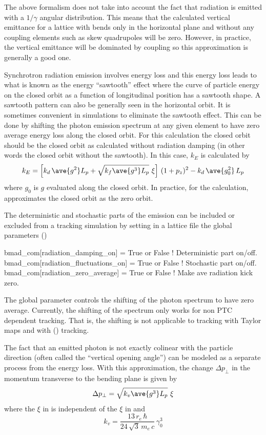 The above formalism does not take into account the fact that radiation is emitted with a $1/\gamma$
angular distribution. This means that the calculated vertical emittance for a lattice with bends
only in the horizontal plane and without any coupling elements such as skew quadrupoles will be
zero. However, in practice, the vertical emittance will be dominated by coupling so this
approximation is generally a good one.

Synchrotron radiation emission involves energy loss and this energy loss leads to what is known as
the energy ``sawtooth'' effect where the curve of particle energy on the closed orbit as a function
of longitudinal position has a sawtooth shape. A sawtooth pattern can also be generally seen in the
horizontal orbit. It is sometimes convenient in simulations to eliminate the sawtooth effect. This
can be done by shifting the photon emission spectrum at any given element to have zero average
energy loss along the closed orbit. For this calculation the closed orbit should be the closed orbit
as calculated without radiation damping (in other words the closed orbit without the sawtooth). In
this case, $k_E$ is calculated by
\begin{equation}
  k_E = \left[ k_d \, \ave{g^2} L_p + \sqrt{k_f \ave{g^3} L_p} \,\, \xi \right] \, (1 + p_z)^2 - 
  k_d \, \ave{g_0^2} \, L_p
\end{equation}
where $g_0$ is $g$ evaluated along the closed orbit. In practice, for the calculation, \bmad
approximates the closed orbit as the zero orbit. 

The deterministic and stochastic parts of the emission can be included or excluded from a tracking
simulation by setting in a lattice file the \bmad global parameters ()
\begin{example}
  bmad_com[radiation_damping_on]      = True or False  ! Deterministic part on/off.
  bmad_com[radiation_fluctuations_on] = True or False  ! Stochastic part on/off.
  bmad_com[radiation_zero_average]    = True or False  ! Make ave radiation kick zero.
\end{example}
The global parameter  controls the shifting of the photon
spectrum to have zero average. Currently, the shifting of the spectrum only works for non PTC
dependent tracking. That is, the shifting is not applicable to tracking with Taylor maps and with
 () tracking.

The fact that an emitted photon is not exactly colinear with the particle direction (often called
the ``vertical opening angle'') can be modeled as a separate process from the energy loss. With this
approximation, the change $\Delta p_\perp$ in the momentum transverse to the bending plane is given
by
\begin{equation}
  \Delta p_\perp = \sqrt{k_v \ave{g^3} L_p} \,\, \xi
  \label{dpkgl}
\end{equation}
where the $\xi$ in  is independent of the $\xi$ in  and
\begin{equation}
 k_v = \frac{13 \, r_e \, \hbar}{24 \, \sqrt{3} \, m_e \, c} \, \gamma_0^3
\end{equation}

